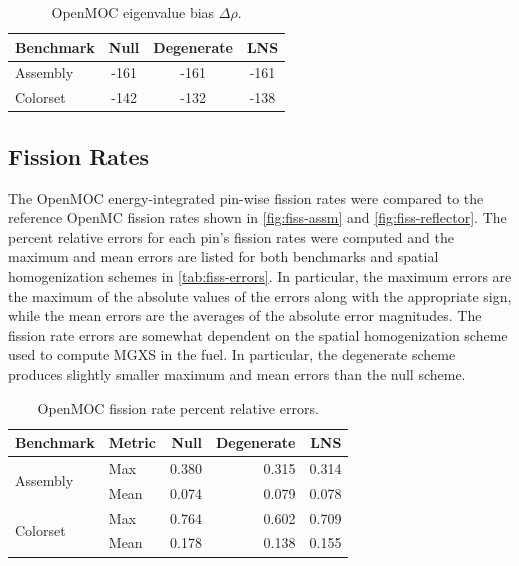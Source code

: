 \begin{table}[h!]
  \centering
  \caption{OpenMOC eigenvalue bias $\Delta\rho$.}
  \label{tab:keff-bias}
  \begin{tabular}{l c c c}
  \toprule
  \textbf{Benchmark} & \textbf{Null} & \textbf{Degenerate} & \textbf{LNS} \\
  \midrule
  Assembly & -161 & -161 & -161 \\
  Colorset & -142 & -132 & -138 \\
  \bottomrule
\end{tabular}
\end{table}


\subsection{Fission Rates}
\label{subsec:fiss-rates}

The OpenMOC energy-integrated pin-wise fission rates were compared to the reference OpenMC fission rates shown in \autoref{fig:fiss-assm} and \autoref{fig:fiss-reflector}. The percent relative errors for each pin's fission rates were computed and the maximum and mean errors are listed for both benchmarks and spatial homogenization schemes in \autoref{tab:fiss-errors}. In particular, the maximum errors are the maximum of the absolute values of the errors along with the appropriate sign, while the mean errors are the averages of the absolute error magnitudes. The fission rate errors are somewhat dependent on the spatial homogenization scheme used to compute MGXS in the fuel. In particular, the degenerate scheme produces slightly smaller maximum and mean errors than the null scheme.

\begin{table}[h!]
  \centering
  \caption{OpenMOC fission rate percent relative errors.}
  \label{tab:fiss-errors}
  \begin{tabular}{l l r r r}
  \toprule
  \textbf{Benchmark} & \textbf{Metric} & \textbf{Null} & \textbf{Degenerate} & \textbf{LNS} \\
  \midrule
  \multirow{2}{*}{Assembly} & Max  & 0.380 & 0.315 & 0.314 \\
                            & Mean & 0.074 & 0.079 & 0.078 \\
  \midrule
  \multirow{2}{*}{Colorset} & Max  & 0.764 & 0.602 & 0.709 \\
                            & Mean & 0.178 & 0.138 & 0.155 \\
  \bottomrule
\end{tabular}
\end{table}

